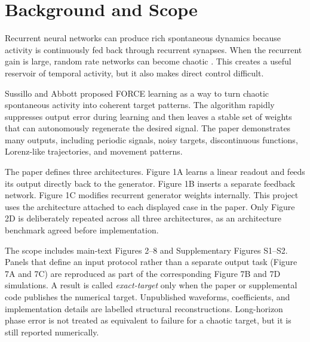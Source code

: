 \section{Background and Scope}

Recurrent neural networks can produce rich spontaneous dynamics because activity is continuously fed back through recurrent synapses. When the recurrent gain is large, random rate networks can become chaotic \cite{sompolinsky_chaos_1988}. This creates a useful reservoir of temporal activity, but it also makes direct control difficult.

Sussillo and Abbott \cite{sussillo_generating_2009} proposed FORCE learning as a way to turn chaotic spontaneous activity into coherent target patterns. The algorithm rapidly suppresses output error during learning and then leaves a stable set of weights that can autonomously regenerate the desired signal. The paper demonstrates many outputs, including periodic signals, noisy targets, discontinuous functions, Lorenz-like trajectories, and movement patterns.

The paper defines three architectures. Figure 1A learns a linear readout and feeds its output directly back to the generator. Figure 1B inserts a separate feedback network. Figure 1C modifies recurrent generator weights internally. This project uses the architecture attached to each displayed case in the paper. Only Figure 2D is deliberately repeated across all three architectures, as an architecture benchmark agreed before implementation.

The scope includes main-text Figures 2--8 and Supplementary Figures S1--S2. Panels that define an input protocol rather than a separate output task (Figure 7A and 7C) are reproduced as part of the corresponding Figure 7B and 7D simulations. A result is called \emph{exact-target} only when the paper or supplemental code publishes the numerical target. Unpublished waveforms, coefficients, and implementation details are labelled structural reconstructions. Long-horizon phase error is not treated as equivalent to failure for a chaotic target, but it is still reported numerically.
